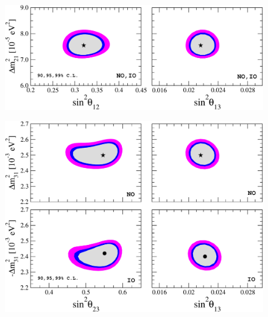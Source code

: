 \documentclass[english]{article}
\begin{document}
    \begin{figure}[!hbt]
		\begin{center}
        \centering
		\includegraphics[scale=0.4]{sq12-sq13-mq21.pdf}
		\end{center}
	\end{figure}
    \begin{figure}[!hbt]
		\begin{center}
        \centering
		\includegraphics[scale=0.4]{sq23-sq13-mq31.pdf}
		\end{center}
	\end{figure}
\end{document}
